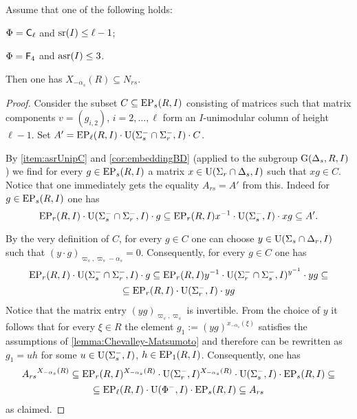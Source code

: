 \begin{lemma}\label{lemma:DVST}
Assume that one of the following holds:
\begin{lemlist}
 \item \label{lemma:DVcaseCl} $\Phi=\mathsf{C}_\ell$ and $\operatorname{sr}(I) \leq \ell-1$;
 \item \label{lemma:DVcaseF4} $\Phi=\mathsf{F}_4$ and $\operatorname{asr}(I) \leq 3$.
\end{lemlist}
Then one has $X_{-\alpha_s}(R) \subseteq N_{rs}$.
\end{lemma}
\begin{proof}
Consider the subset $C \subseteq \operatorname{EP}_s(R, I)$ consisting of matrices such that matrix components $v=(g_{i,2})$, $i=2,\ldots, \ell$ form an $I$-unimodular column of height $\ell-1$.
Set $A' = \operatorname{EP}_\ell(R, I) \cdot \operatorname{U}(\Sigma_s^- \cap \Sigma_r^-, I) \cdot C$.

By \cref{item:asrUnipC} and \cref{cor:embeddingBD} (applied to the subgroup $\operatorname{G}(\Delta_s, R, I)$) we find for every $g \in \operatorname{EP}_s(R, I)$ a matrix $x \in \operatorname{U}(\Sigma_r \cap \Delta_s, I)$ such that $xg \in C$.  
Notice that one immediately gets the equality $A_{rs} = A'$ from this.
Indeed for $g\in \operatorname{EP}_s(R, I)$ one has
\begin{equation*} \operatorname{EP}_r(R, I) \cdot \operatorname{U}(\Sigma_s^- \cap \Sigma_r^-, I) \cdot g \subseteq 
 \operatorname{EP}_r(R, I)x^{-1}  \cdot \operatorname{U}(\Sigma_s^-, I) \cdot xg \subseteq A'. \end{equation*}

By the very definition of $C$, for every $g \in C$ one can choose $y \in \operatorname{U}(\Sigma_s \cap \Delta_r, I)$ such that $(y \cdot g)_{\varpi_s,\varpi_s - \alpha_s} = 0$.
Consequently, for every $g\in C$ one has
\begin{multline*}
 \operatorname{EP}_r(R, I) \cdot \operatorname{U}(\Sigma_s^- \cap \Sigma_r^-, I) \cdot g \subseteq \operatorname{EP}_r(R, I) y^{-1} \cdot \operatorname{U}(\Sigma_r^-\cap \Sigma_s^-, I)^{y^{-1}} \cdot y g \subseteq \\
  \subseteq \operatorname{EP}_r(R, I) \cdot \operatorname{U}(\Sigma_r^-, I) \cdot y g
\end{multline*}
Notice that the matrix entry $(yg)_{\varpi_s,\varpi_s}$ is invertible.
From the choice of $y$ it follows that for every $\xi\in R$ the element $g_1:=(yg)^{x_{-\alpha_s}(\xi)}$
satisfies the assumptions of \cref{lemma:Chevalley-Matsumoto} and therefore can be rewritten as $g_1 = uh$ for some $u \in \operatorname{U}(\Sigma_s^-, I)$, $h \in \operatorname{EP}_1(R, I)$.
Consequently, one has
\begin{multline*} {A_{rs}}^{X_{-\alpha_{s}}(R)} \subseteq \operatorname{EP}_r(R, I)^{X_{-\alpha_{s}}(R)} \cdot \operatorname{U}(\Sigma_r^-, I)^{X_{-\alpha_{s}}(R)} \cdot \operatorname{U}(\Sigma_s^-, I) \cdot \operatorname{EP}_s(R, I) \subseteq \\
 \subseteq \operatorname{EP}_\ell(R, I) \cdot \operatorname{U}(\Phi^-, I) \cdot \operatorname{EP}_s(R, I) \subseteq A_{rs} \end{multline*}
 as claimed.
\end{proof}